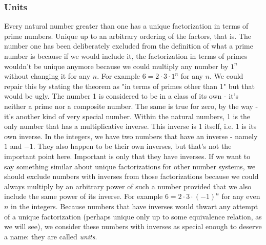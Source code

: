 \subsubsection{Units}
Every natural number greater than one has a unique factorization in terms of prime numbers. Unique up to an arbitrary ordering of the factors, that is. The number one has been deliberately excluded from the definition of what a prime number is because if we would include it, the factorization in terms of primes wouldn't be unique anymore because we could multiply any number by $1^n$ without changing it for any $n$. For example $6 = 2 \cdot 3 \cdot 1^n$ for any $n$. We could repair this by stating the theorem as "in terms of primes other than 1" but that would be ugly. The number 1 is considered to be in a class of its own - it's neither a prime nor a composite number. The same is true for zero, by the way - it's another kind of very special number. Within the natural numbers, 1 is the only number that has a multiplicative inverse. This inverse is 1 itself, i.e. 1 is its own inverse. In the integers, we have two numbers that have an inverse - namely $1$ and $-1$. They also happen to be their own inverses, but that's not the important point here. Important is only that they have inverses. If we want to say something similar about unique factorizations for other number systems, we should exclude numbers with inverses from those factorizations because we could always multiply by an arbitrary power of such a number provided that we also include the same power of its inverse. For example $6 = 2 \cdot 3 \cdot (-1)^n$ for any even $n$ in the integers. Because numbers that have inverses would thwart any attempt of a unique factorization (perhaps unique only up to some equivalence relation, as we will see), we consider these numbers with inverses as special enough to deserve a name: they are called \emph{units}.






